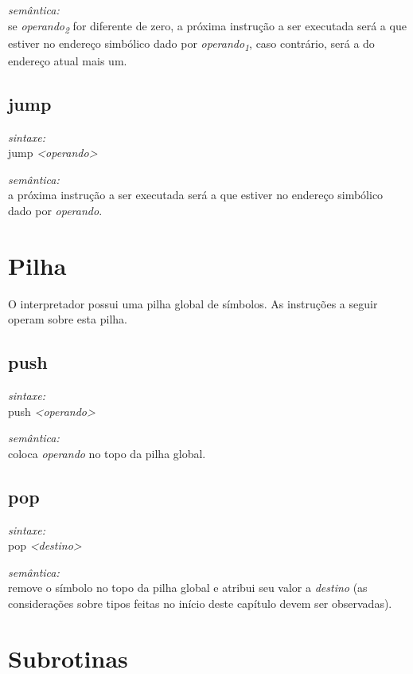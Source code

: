 \documentclass[12pt,a4paper,extrafontsizes,article]{memoir}
\newcommand*{\srcfont}{\fontfamily{pcr}\selectfont}
\begin{document}
\noindent \textit{semântica:}\\se \textit{operando\textsubscript{2}} for diferente de zero, a próxima instrução a ser executada será a que
estiver no endereço simbólico dado por \textit{operando\textsubscript{1}}, caso contrário, será a do endereço atual mais um.


\subsection{\textbf{jump}}

\textit{sintaxe:}\\{\srcfont jump \textit{<operando>}}

\noindent \textit{semântica:}\\a próxima instrução a ser executada será a que estiver no endereço simbólico dado por \textit{operando}.


\section{Pilha}

O interpretador possui uma pilha global de símbolos. As instruções a seguir operam sobre esta pilha.

\subsection{\textbf{push}}

\textit{sintaxe:}\\{\srcfont push \textit{<operando>}}

\noindent \textit{semântica:}\\coloca \textit{operando} no topo da pilha global.


\subsection{\textbf{pop}}

\textit{sintaxe:}\\{\srcfont pop \textit{<destino>}}

\noindent \textit{semântica:}\\remove o símbolo no topo da pilha global e atribui seu valor a \textit{destino} (as
considerações sobre tipos feitas no início deste capítulo devem ser observadas).


\section{Subrotinas}
\end{document}
